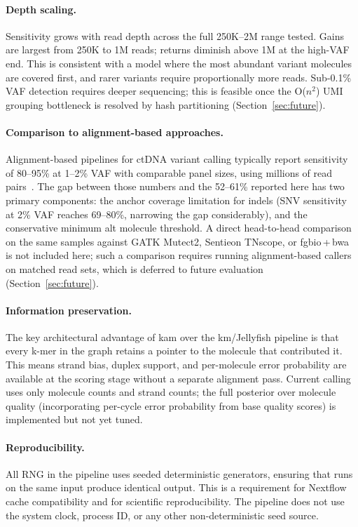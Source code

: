 \paragraph{Depth scaling.}
Sensitivity grows with read depth across the full 250K--2M range tested.
Gains are largest from 250K to 1M reads; returns diminish above 1M at the
high-VAF end. This is consistent with a model where the most abundant variant
molecules are covered first, and rarer variants require proportionally more
reads. Sub-0.1\% VAF detection requires deeper sequencing; this is feasible
once the O($n^2$) UMI grouping bottleneck is resolved by hash partitioning
(Section~\ref{sec:future}).

\paragraph{Comparison to alignment-based approaches.}
Alignment-based pipelines for ctDNA variant calling typically report sensitivity
of 80--95\% at 1--2\% VAF with comparable panel sizes, using millions of
read pairs~\autocite{Twist22cfdna}. The gap between those numbers and the
52--61\% reported here has two primary components: the anchor coverage
limitation for indels (SNV sensitivity at 2\% VAF reaches 69--80\%, narrowing
the gap considerably), and the conservative minimum alt molecule threshold.
A direct head-to-head comparison on the same samples against GATK Mutect2,
Sentieon TNscope, or fgbio\,+\,bwa is not included here; such a
comparison requires running alignment-based callers on matched read sets, which
is deferred to future evaluation (Section~\ref{sec:future}).

\paragraph{Information preservation.}
The key architectural advantage of kam over the km/Jellyfish pipeline is that
every k-mer in the graph retains a pointer to the molecule that contributed it.
This means strand bias, duplex support, and per-molecule error probability are
available at the scoring stage without a separate alignment pass. Current calling
uses only molecule counts and strand counts; the full posterior over molecule
quality (incorporating per-cycle error probability from base quality scores)
is implemented but not yet tuned.

\paragraph{Reproducibility.}
All RNG in the pipeline uses seeded deterministic generators, ensuring that
runs on the same input produce identical output. This is a requirement for
Nextflow cache compatibility and for scientific reproducibility. The pipeline
does not use the system clock, process ID, or any other non-deterministic
seed source.

